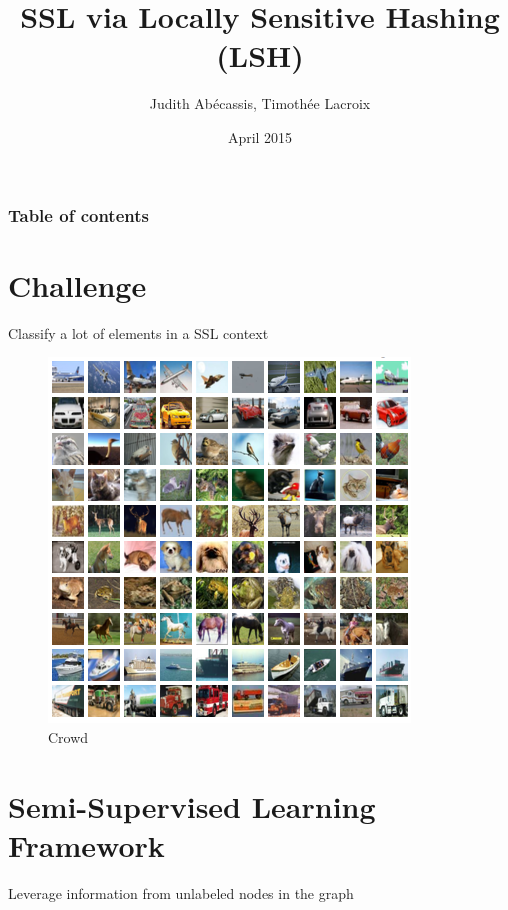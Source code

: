 \documentclass[11pt)]{beamer}
\author{Judith Abécassis, Timothée Lacroix}
\title{SSL via Locally Sensitive Hashing (LSH)}
\institute{Graphs in Machine Learning}
\date{April 2015}
\begin{document}
\graphicspath{{./../report/figures/}}
\begin{frame}
\titlepage
\end{frame}

{
  \begin{frame}
    \frametitle{Table of contents}
    \tableofcontents[currentsection]
  \end{frame}
}


\section{Challenge}
\begin{frame}{Classify a lot of elements in a SSL context}

		\begin{figure}
			\centering
			\includegraphics[width=\textwidth]{cifar-10.png}
			\caption{Crowd}
		\end{figure}


\end{frame}

\section{Semi-Supervised Learning Framework}
\begin{frame}{Leverage information from unlabeled nodes in the graph}

\end{frame}
\end{document}
